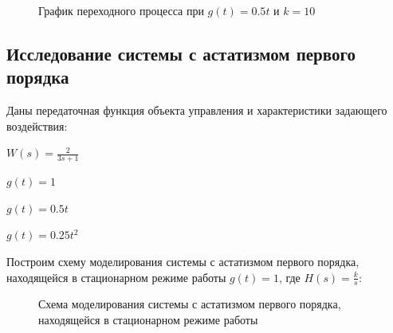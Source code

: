 \documentclass[a4paper, 11pt]{article}
\begin{document}
\begin{figure}[h!]
\caption{График переходного процесса при $g(t) = 0.5t$ и $k = 10$}
\label{ris:image}
\end{figure}

\newpage
\begin{center}
\section{Исследование системы с астатизмом первого порядка}
\end{center}
\par 
Даны передаточная функция объекта управления и характеристики задающего воздействия:
\par
$W(s) = \displaystyle \frac{2}{3s+1}$
\par
$g(t) = 1$
\par
$g(t)=0.5t$
\par
$g(t)=0.25t^2$

\par 
Построим схему моделирования системы с астатизмом первого порядка, находящейся в стационарном режиме работы $g(t) = 1$, где  $H(s)=\frac{k}{s}$:

\begin{figure}[h!]
\caption{Схема моделирования системы с астатизмом первого порядка, находящейся в стационарном режиме работы}
\label{ris:image}
\end{figure}
\end{document}
